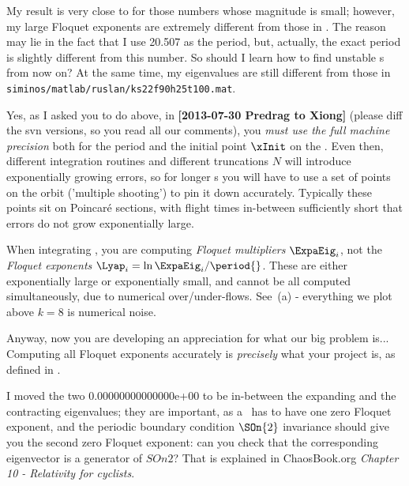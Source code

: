 \begin{description}
My result is very close to   for those numbers whose
magnitude is small; however, my large Floquet exponents are extremely different from those
in . The reason may lie in the fact that I use 20.507 as
the period, but, actually, the exact period is slightly different from this number. So
should I learn how to find unstable \po s from now on?
At the same time, my eigenvalues are still
different from those in \\
\texttt{siminos/matlab/ruslan/ks22f90h25t100.mat}.

\item[2013-08-02 Predrag to Xiong] Yes, as I asked you to do above, in {\bf
[2013-07-30 Predrag to Xiong]} (please diff the svn versions, so you read all
our comments), you \emph{must use the full machine precision}
both for the period \period{} and the initial point $\xInit$ on the \po.
Even then, different integration routines and different truncations $N$
will introduce exponentially growing errors, so for longer \po s you will
have to use a set of points on the orbit ('multiple shooting') to pin
it down accurately. Typically these points sit on
Poincar\'e sections, with flight times in-between sufficiently short
that errors do not grow exponentially large.

\item[2013-08-02 Predrag to Xiong] When integrating ,
you are computing \emph{Floquet multipliers} $\ExpaEig_i$,
not the \emph{Floquet exponents} $\Lyap_i=\ln \ExpaEig_i /\period{}$.
These are either exponentially large or exponentially small, and cannot
be all computed simultaneously, due to numerical over/under-flows. See
\,(a) - everything we plot above $k=8$ is numerical
noise.

Anyway, now you are developing an appreciation for what our big problem
is... Computing all Floquet exponents accurately is \emph{precisely} what
your project is, as defined in .

\item[2013-08-02 Predrag to Xiong] I moved the two
0.00000000000000e+00 to be in-between the expanding and the contracting
eigenvalues; they are important, as a \po\ has to have one zero
Floquet exponent, and the periodic boundary condition $\SOn{2}$
invariance should give you the second zero Floquet exponent: can you
check that the corresponding eigenvector is a generator of $SOn{2}$? That
is explained in ChaosBook.org {\em Chapter 10 - Relativity for cyclists}.


\end{description}
